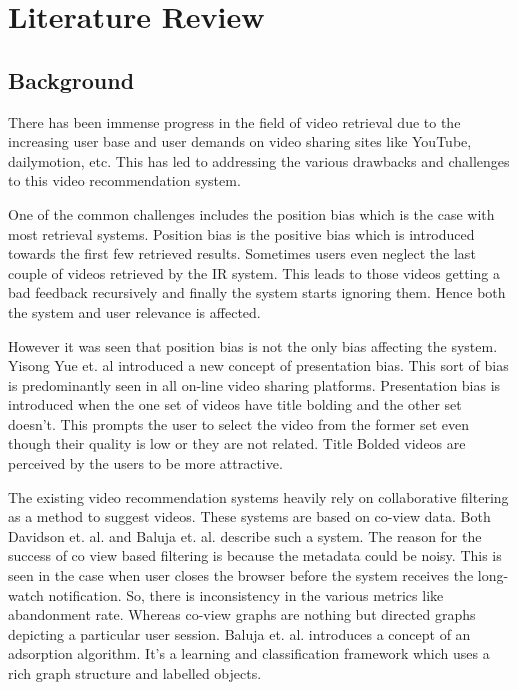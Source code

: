 \chapter{Literature Review}

\section{Background}

There has been immense progress in the field of video retrieval due to the increasing user base and user demands on video sharing sites like YouTube, dailymotion, etc. This has led to addressing the various drawbacks and challenges to this video recommendation system. 

One of the common challenges includes the position bias which is the case with most retrieval systems. Position bias is the positive bias which is introduced towards the first few retrieved results. Sometimes users even neglect the last couple of videos retrieved by the IR system. This leads to those videos getting a bad feedback recursively and finally the system starts ignoring them. Hence both the system and user relevance is affected. \par
However it was seen that position bias is not the only bias affecting the system. Yisong Yue et. al \cite{yue2010} introduced a new concept of presentation bias. This sort of bias is predominantly seen in all on-line video sharing platforms. Presentation bias is introduced when the one set of videos have title bolding and the other set doesn’t. This prompts the user to select the video from the former set even though their quality is low or they are not related. Title Bolded videos are perceived by the users to be more attractive.\par
The existing video recommendation systems heavily rely on collaborative filtering as a method to suggest videos. These systems are based on co-view data. Both Davidson et. al. \cite{davison2010} and Baluja et. al. \cite{baluja2008} describe such a system. The reason for the success of co view based filtering is because the metadata could be noisy. This is seen in the case when user closes the browser before the system receives the long-watch notification. So, there is inconsistency in the various metrics like abandonment rate. Whereas co-view graphs are nothing but directed graphs depicting a particular user session. Baluja et. al. \cite{baluja2008} introduces a concept of an adsorption algorithm. It’s a learning and classification framework which uses a rich graph structure and labelled objects.\par

